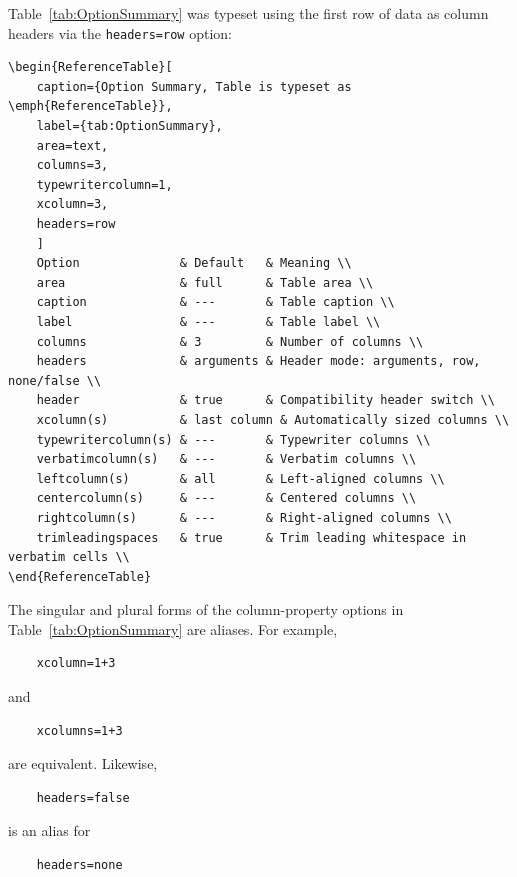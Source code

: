 \documentclass[
11pt,
a4paper,
oneside
]{scrbook}
\begin{document}
{\noindent Table~\ref{tab:OptionSummary} was typeset using the first row of data as column headers via the \texttt{headers=row} option:
\vspace{2ex}
\begin{HalfArea}
\begin{verbatim}
\begin{ReferenceTable}[
	caption={Option Summary, Table is typeset as \emph{ReferenceTable}},
	label={tab:OptionSummary},
	area=text,
	columns=3,
	typewritercolumn=1,
	xcolumn=3,
	headers=row
	]
	Option              & Default   & Meaning \\
	area                & full      & Table area \\
	caption             & ---       & Table caption \\
	label               & ---       & Table label \\
	columns             & 3         & Number of columns \\
	headers             & arguments & Header mode: arguments, row, none/false \\
	header              & true      & Compatibility header switch \\
	xcolumn(s)          & last column & Automatically sized columns \\
	typewritercolumn(s) & ---       & Typewriter columns \\
	verbatimcolumn(s)   & ---       & Verbatim columns \\
	leftcolumn(s)       & all       & Left-aligned columns \\
	centercolumn(s)     & ---       & Centered columns \\
	rightcolumn(s)      & ---       & Right-aligned columns \\
	trimleadingspaces   & true      & Trim leading whitespace in verbatim cells \\
\end{ReferenceTable}	
\end{verbatim}
\end{HalfArea}
The singular and plural forms of the column-property options in
Table~\ref{tab:OptionSummary} are aliases.
For example,
\begin{verbatim}
	xcolumn=1+3
\end{verbatim}
and
\begin{verbatim}
	xcolumns=1+3
\end{verbatim}
are equivalent.
Likewise,
\begin{verbatim}
	headers=false
\end{verbatim}
is an alias for
\begin{verbatim}
	headers=none
\end{verbatim}

}
\end{document}
